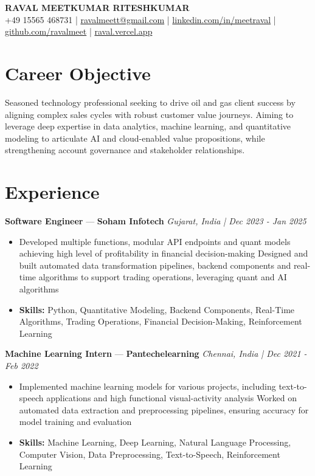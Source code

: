 \documentclass[a4paper,10pt]{article}
\begin{document}
\begin{center}
  {\Large\bfseries RAVAL MEETKUMAR RITESHKUMAR}\\[2pt]
  {\small +49 15565 468731 \;|\; \href{mailto:ravalmeett@gmail.com}{ravalmeett@gmail.com} \;|\; \href{https://www.linkedin.com/in/meetraval/}{linkedin.com/in/meetraval} \;|\; \href{https://github.com/ravalmeet}{github.com/ravalmeet} \;|\; \href{https://raval.vercel.app/}{raval.vercel.app}}
\end{center}
\vspace{-3pt}

\section*{Career Objective}
Seasoned technology professional seeking to drive oil and gas client success by aligning complex sales cycles with robust customer value journeys. Aiming to leverage deep expertise in data analytics, machine learning, and quantitative modeling to articulate AI and cloud-enabled value propositions, while strengthening account governance and stakeholder relationships.\par

\section*{Experience}
\textbf{Software Engineer} — \textbf{Soham Infotech} \hfill \textit{Gujarat, India \;|\; Dec 2023 - Jan 2025}\par
\vspace{1pt}
\begin{itemize}
  \item Developed multiple functions, modular API endpoints and quant models achieving high level of profitability in financial decision-making Designed and built automated data transformation pipelines, backend components and real-time algorithms to support trading operations, leveraging quant and AI algorithms
  \item \textbf{Skills:} Python, Quantitative Modeling, Backend Components, Real-Time Algorithms, Trading Operations, Financial Decision-Making, Reinforcement Learning
\end{itemize}
\vspace{3pt}
\textbf{Machine Learning Intern} — \textbf{Pantechelearning} \hfill \textit{Chennai, India \;|\; Dec 2021 - Feb 2022}\par
\vspace{1pt}
\begin{itemize}
  \item Implemented machine learning models for various projects, including text-to-speech applications and high functional visual-activity analysis Worked on automated data extraction and preprocessing pipelines, ensuring accuracy for model training and evaluation
  \item \textbf{Skills:} Machine Learning, Deep Learning, Natural Language Processing, Computer Vision, Data Preprocessing, Text-to-Speech, Reinforcement Learning
\end{itemize}
\end{document}

